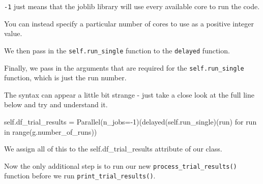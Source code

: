 \documentclass[
  letterpaper,
  DIV=11,
  numbers=noendperiod]{scrreprt}
\newenvironment{Shaded}{}{}
\newcommand{\BuiltInTok}[1]{\textcolor[rgb]{0.84,0.23,0.29}{#1}}
\newcommand{\ControlFlowTok}[1]{\textcolor[rgb]{0.84,0.23,0.29}{#1}}
\newcommand{\DecValTok}[1]{\textcolor[rgb]{0.00,0.36,0.77}{#1}}
\newcommand{\KeywordTok}[1]{\textcolor[rgb]{0.84,0.23,0.29}{#1}}
\newcommand{\NormalTok}[1]{\textcolor[rgb]{0.14,0.16,0.18}{#1}}
\newcommand{\OperatorTok}[1]{\textcolor[rgb]{0.14,0.16,0.18}{#1}}
\newcommand{\VariableTok}[1]{\textcolor[rgb]{0.89,0.38,0.04}{#1}}
\begin{document}
\begin{tcolorbox}[enhanced jigsaw, colframe=quarto-callout-tip-color-frame, bottomtitle=1mm, breakable, rightrule=.15mm, coltitle=black, colbacktitle=quarto-callout-tip-color!10!white, opacityback=0, leftrule=.75mm, arc=.35mm, toptitle=1mm, title=\textcolor{quarto-callout-tip-color}{\faLightbulb}\hspace{0.5em}{Tip}, titlerule=0mm, colback=white, toprule=.15mm, bottomrule=.15mm, left=2mm, opacitybacktitle=0.6]

\texttt{-1} just means that the joblib library will use every available
core to run the code.

You can instead specify a particular number of cores to use as a
positive integer value.

\end{tcolorbox}

We then pass in the \texttt{self.run\_single} function to the
\texttt{delayed} function.

Finally, we pass in the arguments that are required for the
\texttt{self.run\_single} function, which is just the run number.

The syntax can appear a little bit strange - just take a close look at
the full line below and try and understand it.

\begin{Shaded}
\begin{Highlighting}[]
\VariableTok{self}\NormalTok{.df\_trial\_results }\OperatorTok{=}\NormalTok{ Parallel(n\_jobs}\OperatorTok{={-}}\DecValTok{1}\NormalTok{)(delayed(}\VariableTok{self}\NormalTok{.run\_single)(run) }\ControlFlowTok{for}\NormalTok{ run }\KeywordTok{in} \BuiltInTok{range}\NormalTok{(g.number\_of\_runs))}
\end{Highlighting}
\end{Shaded}

We assign all of this to the self.df\_trial\_results attribute of our
class.

Now the only additional step is to run our new
\texttt{process\_trial\_results()} function before we run
\texttt{print\_trial\_results()}.
\end{document}
